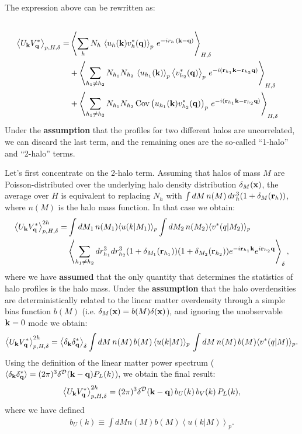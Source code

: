 \documentclass{article}
\begin{document}
The expression above can be rewritten as:
\begin{align}\\
  \left\langle U_{\bf k}V^*_{\bf q}\right\rangle_{p,H,\delta}=&\left\langle\sum_h N_h\,\left\langle u_h({\bf k})v^*_h({\bf q})\right\rangle_p\,e^{-ir_h\,({\bf k}-{\bf q})}\right\rangle_{H,\delta}\\
  &+\left\langle\sum_{h_1\neq h_2}N_{h_1}N_{h_2}\,\left\langle u_{h_1}({\bf k})\right\rangle_p\left\langle v^*_{h_2}({\bf q})\right\rangle_p\,e^{-i({\bf r}_{h_1}{\bf k}-{\bf r}_{h_2}{\bf q})}\right\rangle_{H,\delta}\\
  &+\left\langle\sum_{h_1\neq h_2}N_{h_1}N_{h_2}\,{\rm Cov}\left(u_{h_1}({\bf k})v^*_{h_2}({\bf q})\right)_p\,e^{-i({\bf r}_{h_1}{\bf k}-{\bf r}_{h_2}{\bf q})}\right\rangle_{H,\delta}
\end{align}
Under the {\bf assumption} that the profiles for two different halos are uncorrelated, we can discard the last term, and the remaining ones are the so-called ``1-halo'' and ``2-halo'' terms.

Let's first concentrate on the 2-halo term. Assuming that halos of mass $M$ are Poisson-distributed over the underlying halo density distribution $\delta_M({\bf x})$, the average over $H$ is equivalent to replacing $N_h$ with $\int dM\,n(M)\,dr^3_h(1+\delta_M({\bf r}_h))$, where $n(M)$ is the halo mass function. In that case we obtain:
\begin{align}
  \left\langle U_{\bf k}V^*_{\bf q}\right\rangle_{p,H,\delta}^{2h}=&\int dM_1\,n(M_1) \langle u(k|M_1)\rangle_p\int dM_2\,n(M_2) \langle v^*(q|M_2)\rangle_p\\&\left\langle\sum_{h_1\neq h_2}dr_{h_1}^3dr_{h_2}^3(1+\delta_{M_1}({\bf r}_{h_1}))(1+\delta_{M_2}({\bf r}_{h_2}))e^{-i{\bf r}_{h_1}{\bf k}}e^{i{\bf r}_{h_2}{\bf q}}\right\rangle_{\delta},
\end{align}
where  we have {\bf assumed} that the only quantity that determines the statistics of halo profiles is the halo mass. Under the {\bf assumption} that the halo overdensities are deterministically related to the linear matter overdensity through a simple bias function $b(M)$ (i.e. $\delta_M({\bf x})=b(M)\delta({\bf x})$), and ignoring the unobservable ${\bf k}=0$ mode we obtain:
\begin{align}
  \left\langle U_{\bf k}V^*_{\bf q}\right\rangle_{p,H,\delta}^{2h}=\left\langle\delta_{\bf k}\delta^*_{\bf q}\right\rangle_\delta\int dM\,n(M)\,b(M)\,\langle u(k|M)\rangle_p\,\int dM\,n(M)\,b(M) \langle v^*(q|M)\rangle_p.
\end{align}
Using the definition of the linear matter power spectrum ($\langle\delta_{\bf k}\delta_{\bf q}^*\rangle=(2\pi)^3\delta^{\cal D}({\bf k}-{\bf q})P_L(k)$), we obtain the final result:
\begin{align}
  \left\langle U_{\bf k}V^*_{\bf q}\right\rangle_{p,H,\delta}^{2h}=(2\pi)^3\delta^{\cal D}({\bf k}-{\bf q})\,b_U(k)\,b_V(k)\,P_L(k),
\end{align}
where we have defined
\begin{align}
  b_U(k)\equiv\int dM n(M) b(M) \left\langle u(k|M)\right\rangle_p.
\end{align}
\end{document}
